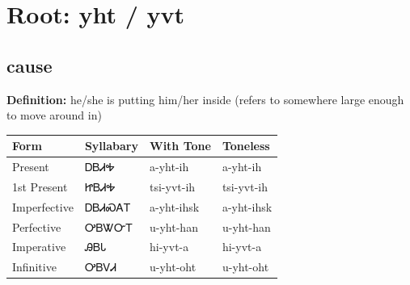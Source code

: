 \documentclass{article}%
\begin{document}
%
\normalsize%
\section*{Root: yht / yvt}%
\subsection*{cause}%
\textbf{Definition: }%
he/she is putting him/her inside (refers to somewhere large enough to move around in)%
\\[0.5em]%
\begin{tabular}{|l|l|l|l|}%
\hline%
\textbf{Form}&\textbf{Syllabary}&\textbf{With Tone}&\textbf{Toneless}\\%
\hline%
Present&ᎠᏴᏗᎭ&a{-}yht{-}ih&a{-}yht{-}ih\\%
1st Present&ᏥᏴᏗᎭ&tsi{-}yvt{-}ih&tsi{-}yvt{-}ih\\%
Imperfective&ᎠᏴᏗᏍᎪᎢ&a{-}yht{-}ihsk&a{-}yht{-}ihsk\\%
Perfective&ᎤᏴᏔᏅᎢ&u{-}yht{-}han&u{-}yht{-}han\\%
Imperative&ᎯᏴᏓ&hi{-}yvt{-}a&hi{-}yvt{-}a\\%
Infinitive&ᎤᏴᏙᏗ&u{-}yht{-}oht&u{-}yht{-}oht\\%
\hline%
\end{tabular}%
\\[1em]%
\end{document}
